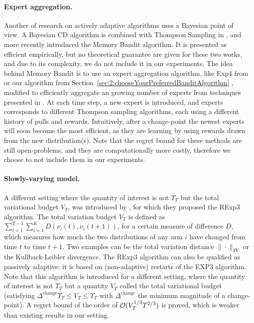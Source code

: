 \paragraph{Expert aggregation.}
%
Another of research on actively adaptive algorithms uses a Bayesian point of view.
A Bayesian CD algorithm is combined with Thompson Sampling in \cite{MellorShapiro13},
and more recently \cite{Alami17} introduced the Memory Bandit algorithm.
It is presented as efficient empirically, but no theoretical guarantee are given for these two works, and due to its complexity, we do not include it in our experiments.
The idea behind Memory Bandit is to use an expert aggregation algorithm, like Exp4 from \cite{Auer02} or our \Aggr{} algorithm from Section~\ref{sec:2:chooseYourPreferredBanditAlgorithm} \cite{Besson2018WCNC}, modified to efficiently aggregate an growing number of experts from techniques presented in \cite{Mourtada17}.
At each time step, a new expert is introduced, and experts corresponds to different Thompson sampling algorithms, each using a different history of pulls and rewards. Intuitively, after a change-point the newest experts will soon become the most efficient, as they are learning by using rewards drawn from the new distribution(s).
%
Note that the regret bound for these methods are still open-problems,
and they are computationally more costly,
therefore we choose to not include them in our experiments.


\paragraph{Slowly-varying model.}

A different setting where the quantity of interest is not $\Upsilon_T$ but the total variational budget $V_T$, was introduced by \cite{Besbes14stochastic}, for which they proposed the RExp3 algorithm.
The total variation budget $V_T$ is defined as $\sum_{t=1}^{T-1} \sum_{i=1}^K D(\nu_i(t), \nu_i(t+1))$, for a certain measure of difference $D$, which measures how much the two distributions of any arm $i$ have changed from time $t$ to time $t+1$.
Two examples can be the total variation distance $\|\cdot\|_{TV}$ or the Kullback-Leibler divergence.
%
The RExp3 algorithm can also be qualified as passively adaptive: it is based on (non-adaptive) restarts of the EXP3 algorithm. Note that this algorithm is introduced for a different setting, where the quantity of interest is not $\Upsilon_T$ but a quantity $V_T$ called the total variational budget (satisfying $\Delta^{\text{change}} \Upsilon_T \leq V_T \leq \Upsilon_T$ with $\Delta^{\text{change}}$ the minimum magnitude of a change-point).
A regret bound of the order of $\mathcal{O}(V_T^{1/3} T^{2/3})$ is proved, which is weaker than existing results in our setting.

